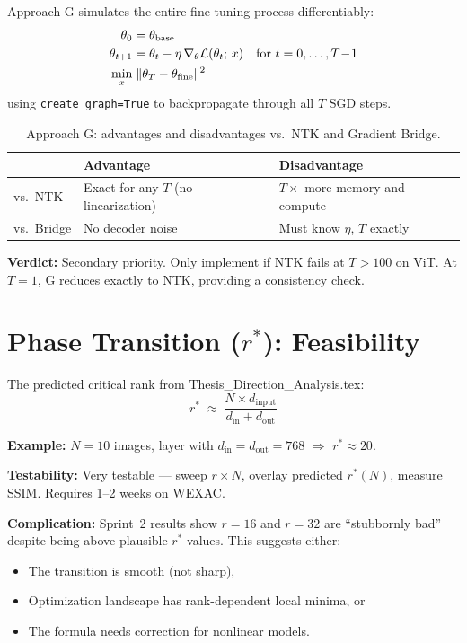 \documentclass[11pt,a4paper]{article}
\begin{document}
Approach G simulates the entire fine-tuning process differentiably:
\begin{align}
    \theta_0 &= \theta_{\text{base}} \notag \\
    \theta_{t+1} &= \theta_t - \eta\, \nabla_\theta \mathcal{L}(\theta_t;\, x) \quad \text{for } t = 0,\ldots,T\!-\!1 \notag \\
    \min_x &\;\|\theta_T - \theta_{\text{fine}}\|^2
\end{align}
using \texttt{create\_graph=True} to backpropagate through all $T$ SGD steps.

\begin{table}[H]
\centering
\caption{Approach G: advantages and disadvantages vs.\ NTK and Gradient Bridge.}
\begin{tabularx}{\textwidth}{lXX}
\toprule
& \textbf{Advantage} & \textbf{Disadvantage} \\
\midrule
vs.\ NTK & Exact for any $T$ (no linearization) & $T\times$ more memory and compute \\
vs.\ Bridge & No decoder noise & Must know $\eta$, $T$ exactly \\
\bottomrule
\end{tabularx}
\end{table}

\textbf{Verdict:} Secondary priority. Only implement if NTK fails at $T > 100$ on ViT. At $T\!=\!1$, G reduces exactly to NTK, providing a consistency check.


\section{Phase Transition ($r^*$): Feasibility}

The predicted critical rank from Thesis\_Direction\_Analysis.tex:
\begin{equation}
    r^* \;\approx\; \frac{N \times d_{\text{input}}}{d_{\text{in}} + d_{\text{out}}}
\end{equation}

\textbf{Example:} $N\!=\!10$ images, layer with $d_{\text{in}} = d_{\text{out}} = 768$ $\Rightarrow$ $r^* \approx 20$.

\textbf{Testability:} Very testable --- sweep $r \times N$, overlay predicted $r^*(N)$, measure SSIM. Requires 1--2 weeks on WEXAC.

\textbf{Complication:} Sprint~2 results show $r\!=\!16$ and $r\!=\!32$ are ``stubbornly bad'' despite being above plausible $r^*$ values. This suggests either:
\begin{itemize}[nosep]
    \item The transition is smooth (not sharp),
    \item Optimization landscape has rank-dependent local minima, or
    \item The formula needs correction for nonlinear models.
\end{itemize}
\end{document}
